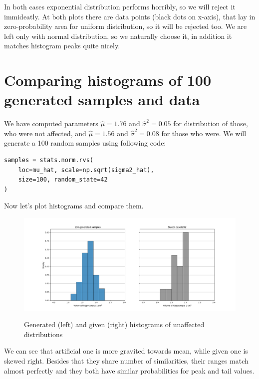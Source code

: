 \documentclass[12pt,a4paper]{article} %
\begin{document}
In both cases exponential distribution performs horribly, so we will reject it immideatly. At both plots there are data points (black dots on x-axis), that lay in zero-probability area for uniform distribution, so it will be rejected too. We are left only with normal distribution, so we naturally choose it, in addition it matches histogram peaks quite nicely.
\newpage

\section{Comparing histograms of 100 generated samples and data}

We have computed parameters $\hat\mu = 1.76$ and $\hat \sigma^2 = 0.05$ for distribution of those, who were not affected, and $\hat\mu = 1.56$ and $\hat\sigma^2 = 0.08$ for those who were. We will generate a 100 random samples using following code:

\begin{lstlisting}
samples = stats.norm.rvs(
    loc=mu_hat, scale=np.sqrt(sigma2_hat),
    size=100, random_state=42
)
\end{lstlisting}

Now let's plot histograms and compare them.

\begin{figure}[h]
  \centering
  \includegraphics[width=\textwidth]{./img/comparing_generated_unaffected.png}
  \label{fig:comp_gen_unaff}
  \caption{Generated (left) and given (right) histograms of unaffected distributions}
\end{figure}

We can see that artificial one is more gravited towards mean, while given one is skewed right. Besides that they share number of similarities, their ranges match almost perfectly and they both have similar probabilities for peak and tail values.
\end{document}
